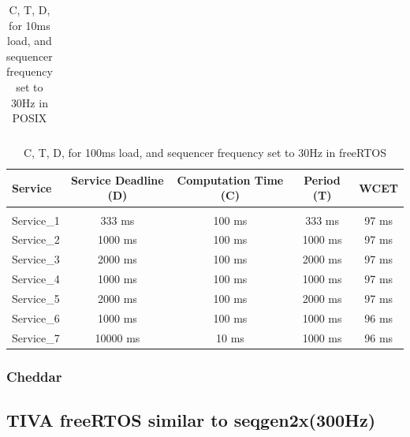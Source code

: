 \documentclass[a4paper,11pt]{article}%
\newenvironment{qanda}{\setlength{\parindent}{0pt}}{\bigskip}
\begin{document}
\begin{qanda}
\begin{enumerate}
\begin{table}[H]
\begin{tabular}{l c c c c}
					\hline\hline
				\end{tabular}
				\caption{C, T, D, for 10ms load, and sequencer frequency set to 30Hz in POSIX}
			\end{table}

			\begin{table}[H]
				\centering
				\begin{tabular}{l c c c c}
					\hline
					\textbf{Service} & \textbf{Service	Deadline (D)} & \textbf{Computation Time (C)} & \textbf{Period (T)} & \textbf{WCET} \\\hline
					                 &                              &                                                                     \\
					Service\_1       & 333 ms                      & 100 ms                         & 333 ms              & 97 ms  \\
					Service\_2       & 1000 ms                       & 100 ms                         & 1000 ms             & 97 ms  \\
					Service\_3       & 2000 ms                       & 100 ms                         & 2000 ms             & 97 ms  \\
					Service\_4       & 1000 ms                       & 100 ms                         & 1000 ms             & 97 ms  \\
					Service\_5       & 2000 ms                       & 100 ms                         & 2000 ms             & 97 ms  \\
					Service\_6       & 1000 ms                       & 100 ms                         & 1000 ms             & 96 ms  \\
					Service\_7       & 10000 ms                      & 10 ms                         & 1000 ms             & 96 ms  \\

					\hline\hline
				\end{tabular}
				\caption{C, T, D, for 100ms load, and sequencer frequency set to 30Hz in freeRTOS}
			\end{table}

			\subsubsection{Cheddar}

			\subsection{TIVA freeRTOS similar to seqgen2x(300Hz)}


\end{enumerate}
\end{qanda}
\end{document}
